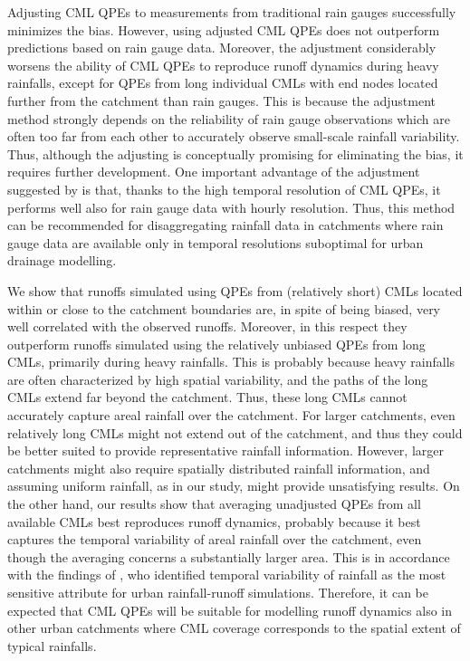 \documentclass{ctuthesis}\usepackage[]{graphicx}\usepackage[]{color}
\begin{document}
Adjusting CML QPEs to measurements from traditional rain gauges \citep{fenclGaugeadjustedRainfallEstimates2017} successfully minimizes the bias. However, using adjusted CML QPEs does not outperform predictions based on rain gauge data. Moreover, the adjustment considerably worsens the ability of CML QPEs to reproduce runoff dynamics during heavy rainfalls, except for QPEs from long individual CMLs with end nodes located further from the catchment than rain gauges. This is because the adjustment method strongly depends on the reliability of rain gauge observations which are often too far from each other to accurately observe small-scale rainfall variability. Thus, although the adjusting is conceptually promising for eliminating the bias, it requires further development. One important advantage of the adjustment suggested by \cite{fenclGaugeadjustedRainfallEstimates2017} is that, thanks to the high temporal resolution of CML QPEs, it performs well also for rain gauge data with hourly resolution. Thus, this method can be recommended for disaggregating rainfall data in catchments where rain gauge data are available only in temporal resolutions suboptimal for urban drainage modelling.

We show that runoffs simulated using QPEs from (relatively short) CMLs located within or close to the catchment boundaries are, in spite of being biased, very well correlated with the observed runoffs. Moreover, in this respect they outperform runoffs simulated using the relatively unbiased QPEs from long CMLs, primarily during heavy rainfalls. This is probably because heavy rainfalls are often characterized by high spatial variability, and the paths of the long CMLs extend far beyond the catchment. Thus, these long CMLs cannot accurately capture areal rainfall over the catchment. For larger catchments, even relatively long CMLs might not extend out of the catchment, and thus they could be better suited to provide representative rainfall information. However, larger catchments might also require spatially distributed rainfall information, and assuming uniform rainfall, as in our study, might provide unsatisfying results. On the other hand, our results show that averaging unadjusted QPEs from all available CMLs best reproduces runoff dynamics, probably because it best captures the temporal variability of areal rainfall over the catchment, even though the averaging concerns a substantially larger area. This is in accordance with the findings of \cite{ochoa-rodriguezImpactSpatialTemporal2015}, who identified temporal variability of rainfall as the most sensitive attribute for urban rainfall-runoff simulations. Therefore, it can be expected that CML QPEs will be suitable for modelling runoff dynamics also in other urban catchments where CML coverage corresponds to the spatial extent of typical rainfalls.
\end{document}
